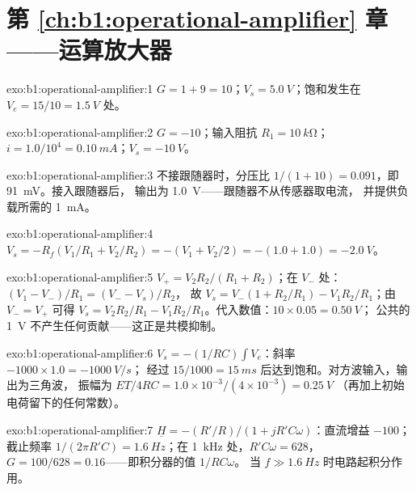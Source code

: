\section*{第 \ref{ch:b1:operational-amplifier} 章——运算放大器}

\begin{solution}{exo:b1:operational-amplifier:1}
$G = 1 + 9 = 10$；$V_s = \qty{5.0}{V}$；饱和发生在 $V_e = 15/10 =
\qty{1.5}{V}$ 处。
\end{solution}

\begin{solution}{exo:b1:operational-amplifier:2}
$G = -10$；输入阻抗 $R_1 = \qty{10}{k\ohm}$；$i = 1.0/10^4 =
\qty{0.10}{mA}$；$V_s = \qty{-10}{V}$。
\end{solution}

\begin{solution}{exo:b1:operational-amplifier:3}
不接跟随器时，分压比 $1/(1 + 10) = 0.091$，即 \qty{91}{mV}。接入跟随器后，
输出为 \qty{1.0}{V}——跟随器不从传感器取电流，
并提供负载所需的 \qty{1}{mA}。
\end{solution}

\begin{solution}{exo:b1:operational-amplifier:4}
$V_s = -R_f(V_1/R_1 + V_2/R_2) = -(V_1 + V_2/2) = -(1.0 + 1.0) = \qty{-2.0}{V}$。
\end{solution}

\begin{solution}{exo:b1:operational-amplifier:5}
$V_+ = V_2R_2/(R_1 + R_2)$；在 $V_-$ 处：$(V_1 - V_-)/R_1 = (V_- - V_s)/R_2$，
故 $V_s = V_-(1 + R_2/R_1) - V_1R_2/R_1$；由 $V_- = V_+$ 可得
$V_s = V_2R_2/R_1 - V_1R_2/R_1$。代入数值：$10 \times 0.05 = \qty{0.50}{V}$；
公共的 \qty{1}{V} 不产生任何贡献——这正是共模抑制。
\end{solution}

\begin{solution}{exo:b1:operational-amplifier:6}
$V_s = -(1/RC)\int V_e$：斜率 $-1000 \times 1.0 = \qty{-1000}{V/s}$；
经过 $15/1000 = \qty{15}{ms}$ 后达到饱和。对方波输入，输出为三角波，
振幅为 $ET/4RC = 1.0 \times 10^{-3}/(4 \times 10^{-3}) = \qty{0.25}{V}$
（再加上初始电荷留下的任何常数）。
\end{solution}

\begin{solution}{exo:b1:operational-amplifier:7}
$\underline H = -(R'/R)/(1 + jR'C\omega)$：直流增益 $-100$；截止频率
$1/(2\pi R'C) = \qty{1.6}{Hz}$；在 \qty{1}{kHz} 处，$R'C\omega = 628$，$G =
100/628 = 0.16$——即积分器的值 $1/RC\omega$。
当 $f \gg \qty{1.6}{Hz}$ 时电路起积分作用。
\end{solution}

